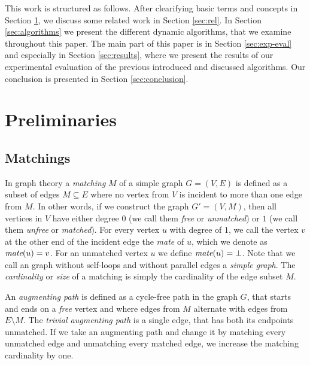 \documentclass{article}      %
\DeclareMathOperator\mate{\emph{mate}}
\begin{document}
This work is structured as follows. After clearifying basic terms and concepts in Section \ref{sec:prelim}, we discuss some related work in Section \ref{sec:rel}. In Section \ref{sec:algorithms} we present the different dynamic algorithms, that we examine throughout this paper. The main part of this paper is in Section \ref{sec:exp-eval} and especially in Section \ref{sec:results}, where we present the results of our experimental evaluation of the previous introduced and discussed algorithms. Our conclusion is presented in Section \ref{sec:conclusion}.


\pagebreak
\section{Preliminaries}
\label{sec:prelim}


\subsection{Matchings}
\label{sec:matchings}

In graph theory a \emph{matching} $M$ of a simple graph $G=(V,E)$ is defined as a subset of edges $M \subseteq E$ where no vertex from $V$ is incident to more than one edge from $M$. In other words, if we construct the graph $G'=(V,M)$, then all vertices in $V$ have either degree $0$ (we call them \emph{free} or \emph{unmatched}) or $1$ (we call them \emph{unfree} or \emph{matched}). For every vertex $u$ with degree of $1$, we call the vertex $v$ at the other end of the incident edge the \emph{mate} of $u$, which we denote as $\mate(u)=v$. For an unmatched vertex $u$ we define $\mate(u)=\bot$. Note that we call an graph without self-loops and without parallel edges a \emph{simple graph}. The \emph{cardinality} or \emph{size} of a matching is simply the cardinality of the edge subset $M$.

An \emph{augmenting path} is defined as a cycle-free path in the graph $G$, that starts and ends on a \emph{free} vertex and where edges from $M$ alternate with edges from $E \setminus M$. The \emph{trivial augmenting path} is a single edge, that has both its endpoints unmatched. If we take an augmenting path and change it by matching every unmatched edge and unmatching every matched edge, we increase the matching cardinality by one.
\end{document}
